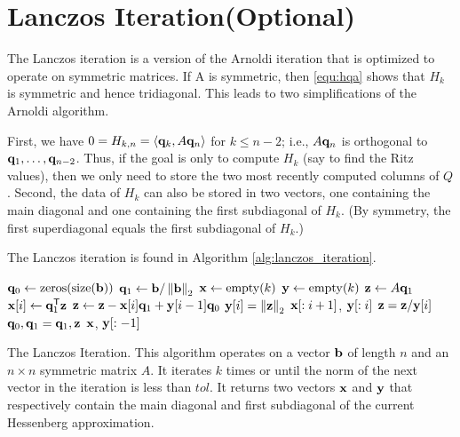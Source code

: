 \section*{Lanczos Iteration(Optional)}
The Lanczos iteration is a version of the Arnoldi iteration that is optimized to operate on symmetric matrices.
If A is symmetric, then \eqref{equ:hqa} shows that $H_k$ is symmetric and hence tridiagonal.
This leads to two simplifications of the Arnoldi algorithm.

First, we have $0=H_{k, n}=\langle {\bf q}_k, A{\bf q}_n \rangle$ for $k \leq n-2$; i.e., $A{\bf q}_n$ is orthogonal to ${\bf q}_1, \ldots, {\bf q}_{n-2}$. 
Thus, if the goal is only to compute $H_k$ (say to find the Ritz values), then we only need to store the two most recently computed columns of $Q$.
Second, the data of $H_k$ can also be stored in two vectors, one containing the main diagonal and one containing the first subdiagonal of $H_k$. 
(By symmetry, the first superdiagonal equals the first subdiagonal of $H_k$.)

The Lanczos iteration is found in Algorithm \ref{alg:lanczos_iteration}.

\begin{algorithm}
\begin{algorithmic}[1]
	\State $\q_0 \gets \zeros{\size{\b}}$								
	\State ${\bf q}_1 \gets {\bf b}/\left\lVert{\bf b}\right\rVert_2$
	\State $\x \gets \allocate{k}$
	\State $\y \gets \allocate{k}$
										
		\State ${\bf z} \gets A{\bf q}_1$					
		\State ${\bf x}[i] \gets {\bf q}_1^{\mathsf T} {\bf z}$				
		\State ${\bf z} \gets {\bf z} - {\bf x}[i] {\bf q}_1 + {\bf y}[i-1] {\bf q}_0$				
		\State ${\bf y}[i] = \left\lVert{\bf z}\right\rVert_2$						
										
			\State {} ${\bf x}[: i+1]$, ${\bf y}[: i]$
		\EndIf
		\State ${\bf z} = {\bf z}/ {\bf y}[i]$
		\State ${\bf q}_0, {\bf q}_1 = {\bf q}_1, {\bf z}$						
	\EndFor
	\State {} ${\bf x}$, ${\bf y}[: -1]$
\EndProcedure
\end{algorithmic}
\caption{The Lanczos Iteration. This algorithm operates on a vector ${\bf b}$ of length $n$ and an $n \times n$ symmetric matrix $A$. It iterates $k$ times or until the norm of the next vector in the iteration is less than $tol$. It returns two vectors ${\bf x}$ and ${\bf y}$ that respectively contain the main diagonal and first subdiagonal of the current Hessenberg approximation.}
\label{alg:lanczos_iteration}
\end{algorithm}

